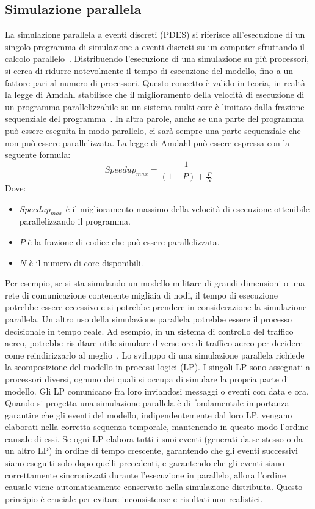 \documentclass[12pt,a4paper,openright,twoside]{book}
\begin{document}
\subsection{Simulazione parallela}
La simulazione parallela a eventi discreti (PDES) si riferisce all'esecuzione di un singolo programma di simulazione a eventi discreti su un computer sfruttando il calcolo parallelo~\cite{DBLP:journals/cacm/Fujimoto90}. Distribuendo l'esecuzione di una simulazione su più processori, si cerca di ridurre notevolmente il tempo di esecuzione del modello, fino a un fattore pari al numero di processori. Questo concetto è valido in teoria, in realtà la legge di Amdahl stabilisce che il miglioramento della velocità di esecuzione di un programma parallelizzabile su un sistema multi-core è limitato dalla frazione sequenziale del programma~\cite{DBLP:conf/afips/Amdahl67}. In altra parole, anche se una parte del programma può essere eseguita in modo parallelo, ci sarà sempre una parte sequenziale che non può essere parallelizzata. La legge di Amdahl può essere espressa con la seguente formula: 
$$
Speedup_{max} = \frac{1}{(1-P)+\frac{P}{N}}
$$
Dove: 
\begin{itemize}
    \item $Speedup_{max}$ è il miglioramento massimo della velocità di esecuzione ottenibile parallelizzando il programma. 
    \item $P$ è la frazione di codice che può essere parallelizzata. 
    \item $N$ è il numero di core disponibili.
\end{itemize}
Per esempio, se si sta simulando un modello militare di grandi dimensioni o una rete di comunicazione contenente migliaia di nodi, il tempo di esecuzione potrebbe essere eccessivo e si potrebbe prendere in considerazione la simulazione parallela. Un altro uso della simulazione parallela potrebbe essere il processo decisionale in tempo reale. Ad esempio, in un sistema di controllo del traffico aereo, potrebbe risultare utile simulare diverse ore di traffico aereo per decidere come reindirizzarlo al meglio~\cite{DBLP:conf/wsc/Wieland98}. 
Lo sviluppo di una simulazione parallela richiede la scomposizione del modello in processi logici (LP). I singoli LP sono assegnati a processori diversi, ognuno dei quali si occupa di simulare la propria parte di modello. Gli LP comunicano fra loro inviandosi messaggi o eventi con data e ora.
Quando si progetta una simulazione parallela è di fondamentale importanza garantire che gli eventi del modello, indipendentemente dal loro LP, vengano elaborati nella corretta sequenza temporale, mantenendo in questo modo l'ordine causale di essi. Se ogni LP elabora tutti i suoi eventi (generati da se stesso o da un altro LP) in ordine di tempo crescente, garantendo che gli eventi successivi siano eseguiti solo dopo quelli precedenti, e garantendo che gli eventi siano correttamente sincronizzati durante l'esecuzione in parallelo, allora l'ordine causale viene automaticamente conservato nella simulazione distribuita. Questo principio è cruciale per evitare inconsistenze e risultati non realistici.
\end{document}
